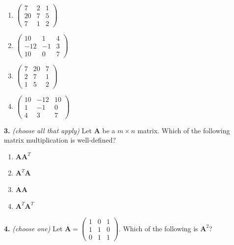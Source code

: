 \documentclass[10pt,a4paper]{article}
\begin{document}
\begin{enumerate}[label=(\Alph*)]
\item \(\begin{pmatrix}7&2&1\\20&7&5\\7&1&2\end{pmatrix}\)
\item \(\begin{pmatrix}10&1&4\\-12&-1&3\\10&0&7\end{pmatrix}\)
\item \(\begin{pmatrix}7&20&7\\2&7&1\\1&5&2\end{pmatrix}\)
\item \(\begin{pmatrix}10&-12&10\\1&-1&0\\4&3&7\end{pmatrix}\)
\end{enumerate}
\smallskip
\textbf{3.} \textit{(choose all that apply)} Let \(\mathbf{A}\) be a \(m\times n\) matrix. Which of the following matrix multiplication is well-defined?

\begin{enumerate}[label=(\Alph*)]
\item \(\mathbf{AA}^T\)
\item \(\mathbf{A}^T\mathbf{A}\)
\item \(\mathbf{AA}\)
\item \(\mathbf{A}^T\mathbf{A}^T\)
\end{enumerate}
\smallskip
\textbf{4.} \textit{(choose one)} Let \(\mathbf{A}=\begin{pmatrix}1&0&1\\1&1&0\\0&1&1\end{pmatrix}\). Which of the following is \(\mathbf{A}^2\)?
\end{document}
